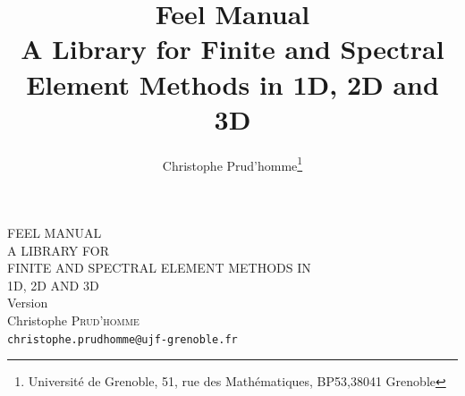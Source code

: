 \documentclass[a4paper]{book}
\title{Feel Manual\\
A Library for Finite and Spectral Element Methods in 1D, 2D and 3D\\
{\small \feelversion }}
\author{Christophe Prud'homme\thanks{Université de Grenoble,
51, rue des Mathématiques, BP53,38041 Grenoble}}
\date{}
\begin{document}
\thispagestyle{empty}






\begin{center}
  {\Large
    FEEL MANUAL\\
    A LIBRARY FOR \\
    FINITE AND SPECTRAL ELEMENT METHODS IN\\
    1D, 2D AND 3D\\
    \bigskip
    {\small Version \feelversion }}\\[0.6cm]
  Christophe \textsc{Prud'homme}\\
  \texttt{christophe.prudhomme@ujf-grenoble.fr}\\
  \par\vspace{2cm}




\end{center}

\vfill \mbox{} \clearpage
\end{document}
